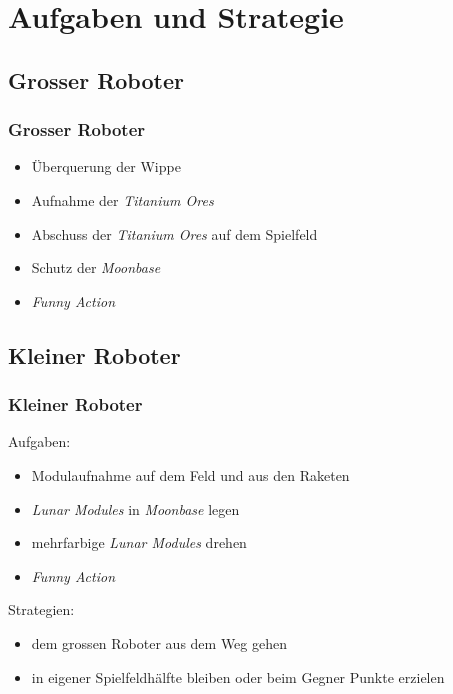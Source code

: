 \section{Aufgaben und Strategie}

\subsection{Grosser Roboter}

\begin{frame}
	\frametitle{Grosser Roboter}
	\begin{itemize}
		\item Überquerung der Wippe
		\item Aufnahme der \textit{Titanium Ores}
		\item Abschuss der \textit{Titanium Ores} auf dem Spielfeld
		\item Schutz der \textit{Moonbase}
		\item \textit{Funny Action}
	\end{itemize}
\end{frame}

\subsection{Kleiner Roboter}

\begin{frame}
	\frametitle{Kleiner Roboter}
	Aufgaben:
	\begin{itemize}
		\item Modulaufnahme auf dem Feld und aus den Raketen
		\item \textit{Lunar Modules} in \textit{Moonbase} legen
		\item mehrfarbige \textit{Lunar Modules} drehen
		\item \textit{Funny Action}
	\end{itemize}
	\vspace{1em}
	Strategien:
	\begin{itemize}
		\item dem grossen Roboter aus dem Weg gehen
		\item in eigener Spielfeldhälfte bleiben oder beim Gegner Punkte erzielen
	\end{itemize}
\end{frame}